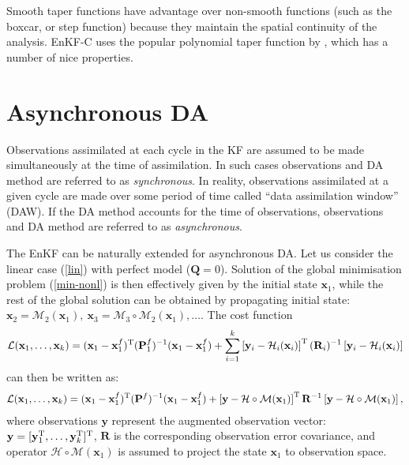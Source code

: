 \documentclass[11pt]{report}
\newcommand{\mb} {\mathbf}
\newcommand{\T}{^{\tiny \mathrm T}}
\begin{document}
Smooth taper functions have advantage over non-smooth functions (such as the boxcar, or step function) because they maintain the spatial continuity of the analysis.
EnKF-C uses the popular polynomial taper function by \citet{gas99a}, which has a number of nice properties.

\section{Asynchronous DA}

Observations assimilated at each cycle in the KF are assumed to be made simultaneously at the time of assimilation.
In such cases observations and DA method are referred to as \emph{synchronous}.
In reality, observations assimilated at a given cycle are made over some period of time called ``data assimilation window'' (DAW).
If the DA method accounts for the time of observations, observations and DA method are referred to as \emph{asynchronous}.

The EnKF can be naturally extended for asynchronous DA.
Let us consider the linear case (\ref{lin}) with perfect model ($\mb Q = 0$).
Solution of the global minimisation problem (\ref{min-nonl}) is then effectively given by the initial state $\mb x_1$, while the rest of the global solution can be obtained by propagating initial state: $\mb x_2 = \mathcal M_2(\mb x_1),\ \mb x_3 = \mathcal M_3 \circ \mathcal M_2(\mb x_1), \dots$.
The cost function
\begin{align*}
  \mathcal L(\mb x_1, \dots, \mb x_k)  = (\mb x_1 - \mb x_1^f)\T (\mb P_1^f)^{-1} (\mb x_1 - \mb x_1^f) + \sum_{i = 1}^k \left [ \mb y_i - \mathcal H_i(\mb x_i) \right ] \T (\mb R_i)^{-1} \left [ \mb y_i - \mathcal H_i(\mb x_i) \right ]
\end{align*}
can then be written as:
\begin{align}
  \label{cost-async}
  \mathcal L(\mb x_1, \dots, \mb x_k)  = (\mb x_1 - \mb x_1^f)\T (\mb P^f)^{-1} (\mb x_1 - \mb x_1^f) + \left [ \mb y - \mathcal H \circ \mathcal M(\mb x_1) \right ] \T \mb R^{-1} \left [ \mb y - \mathcal H\circ \mathcal M(\mb x_1) \right ],
\end{align}
where observations $\mb y$ represent the augmented observation vector: $\mb y = [\mb y_1\T,\dots,\mb y_k\T]\T$, $\mb R$ is the corresponding observation error covariance, and operator $\mathcal H \circ \mathcal M (\mb x_1)$ is assumed to project the state $\mb x_1$ to observation space.
\end{document}
